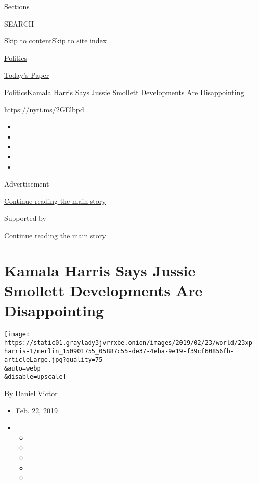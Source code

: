 Sections

SEARCH

\protect\hyperlink{site-content}{Skip to
content}\protect\hyperlink{site-index}{Skip to site index}

\href{https://www.nytimes3xbfgragh.onion/section/politics}{Politics}

\href{https://myaccount.nytimes3xbfgragh.onion/auth/login?response_type=cookie\&client_id=vi}{}

\href{https://www.nytimes3xbfgragh.onion/section/todayspaper}{Today's
Paper}

\href{/section/politics}{Politics}\textbar{}Kamala Harris Says Jussie
Smollett Developments Are Disappointing

\url{https://nyti.ms/2GElbpd}

\begin{itemize}
\item
\item
\item
\item
\item
\end{itemize}

Advertisement

\protect\hyperlink{after-top}{Continue reading the main story}

Supported by

\protect\hyperlink{after-sponsor}{Continue reading the main story}

\hypertarget{kamala-harris-says-jussie-smollett-developments-are-disappointing}{%
\section{Kamala Harris Says Jussie Smollett Developments Are
Disappointing}\label{kamala-harris-says-jussie-smollett-developments-are-disappointing}}

\texttt{[image: https://static01.graylady3jvrrxbe.onion/images/2019/02/23/world/23xp-harris-1/merlin\_150901755\_05887c55-de37-4eba-9e19-f39cf60856fb-articleLarge.jpg?quality=75\\\&auto=webp\\\&disable=upscale]}

By \href{https://www.nytimes3xbfgragh.onion/by/daniel-victor}{Daniel
Victor}

\begin{itemize}
\item
  Feb. 22, 2019
\item
  \begin{itemize}
  \item
  \item
  \item
  \item
  \item
  \end{itemize}
\end{itemize}

